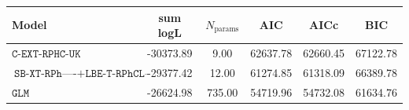 \begin{tabular}{lccccc}
\toprule
Model & sum logL & $N_{\text{params}}$ & AIC & AICc & BIC \\
\midrule
$\texttt{C-EXT-RPHC-UK}$ & -30373.89 & 9.00 & 62637.78 & 62660.45 & 67122.78 \\
$\texttt{SB-XT-RPh----}+\texttt{LBE-T-RPhCL--}$ & -29377.42 & 12.00 & 61274.85 & 61318.09 & 66389.78 \\
$\texttt{GLM}$ & -26624.98 & 735.00 & 54719.96 & 54732.08 & 61634.76 \\
\bottomrule
\end{tabular}
